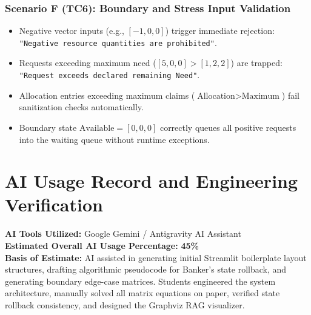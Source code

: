 \documentclass[11pt,a4paper]{article}
\begin{document}
\subsubsection{Scenario F (TC6): Boundary and Stress Input Validation}
\begin{itemize}[leftmargin=1.5em,noitemsep]
    \item Negative vector inputs (e.g., $[-1, 0, 0]$) trigger immediate rejection: \texttt{"Negative resource quantities are prohibited"}.
    \item Requests exceeding maximum need ($[5, 0, 0] > [1, 2, 2]$) are trapped: \texttt{"Request exceeds declared remaining Need"}.
    \item Allocation entries exceeding maximum claims ($\text{Allocation} > \text{Maximum}$) fail sanitization checks automatically.
    \item Boundary state $\text{Available} = [0, 0, 0]$ correctly queues all positive requests into the waiting queue without runtime exceptions.
\end{itemize}

\section{AI Usage Record and Engineering Verification}

\noindent\textbf{AI Tools Utilized:} Google Gemini / Antigravity AI Assistant\\
\textbf{Estimated Overall AI Usage Percentage:} \textbf{45\%}\\
\textbf{Basis of Estimate:} AI assisted in generating initial Streamlit boilerplate layout structures, drafting algorithmic pseudocode for Banker's state rollback, and generating boundary edge-case matrices. Students engineered the system architecture, manually solved all matrix equations on paper, verified state rollback consistency, and designed the Graphviz RAG visualizer.
\end{document}
